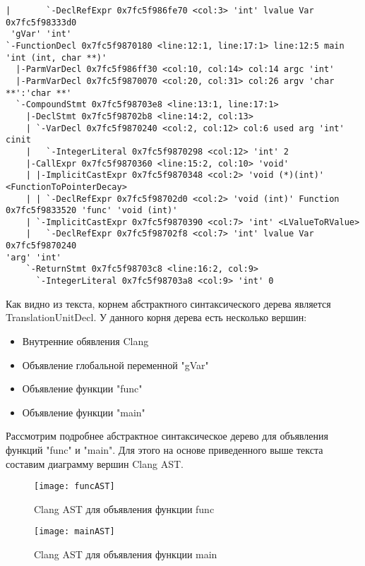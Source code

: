 \begin{lstlisting}[basicstyle=\tiny]
|       `-DeclRefExpr 0x7fc5f986fe70 <col:3> 'int' lvalue Var 0x7fc5f98333d0
 'gVar' 'int'
`-FunctionDecl 0x7fc5f9870180 <line:12:1, line:17:1> line:12:5 main 
'int (int, char **)'
  |-ParmVarDecl 0x7fc5f986ff30 <col:10, col:14> col:14 argc 'int'
  |-ParmVarDecl 0x7fc5f9870070 <col:20, col:31> col:26 argv 'char **':'char **'
  `-CompoundStmt 0x7fc5f98703e8 <line:13:1, line:17:1>
    |-DeclStmt 0x7fc5f98702b8 <line:14:2, col:13>
    | `-VarDecl 0x7fc5f9870240 <col:2, col:12> col:6 used arg 'int' cinit
    |   `-IntegerLiteral 0x7fc5f9870298 <col:12> 'int' 2
    |-CallExpr 0x7fc5f9870360 <line:15:2, col:10> 'void'
    | |-ImplicitCastExpr 0x7fc5f9870348 <col:2> 'void (*)(int)' 
<FunctionToPointerDecay>
    | | `-DeclRefExpr 0x7fc5f98702d0 <col:2> 'void (int)' Function 
0x7fc5f9833520 'func' 'void (int)'
    | `-ImplicitCastExpr 0x7fc5f9870390 <col:7> 'int' <LValueToRValue>
    |   `-DeclRefExpr 0x7fc5f98702f8 <col:7> 'int' lvalue Var 0x7fc5f9870240
'arg' 'int'
    `-ReturnStmt 0x7fc5f98703c8 <line:16:2, col:9>
      `-IntegerLiteral 0x7fc5f98703a8 <col:9> 'int' 0
\end{lstlisting}

Как видно из текста, корнем абстрактного синтаксического дерева является TranslationUnitDecl.
У данного корня дерева есть несколько вершин:
\begin{itemize}
 \item Внутренние обявления Clang
 \item Объявление глобальной переменной "gVar"
 \item Объявление функции "func"
 \item Объявление функции "main"
\end{itemize}

Рассмотрим подробнее абстрактное синтаксическое дерево для объявления функций "func" и "main". Для этого
на основе приведенного выше текста составим диаграмму вершин Clang AST.
\begin{figure}[H]
\centering
\texttt{[image: funcAST]}
\caption{Clang AST для объявления функции func}%
\label{fig:funcAST}
\end{figure}
\begin{figure}[H]
\centering
\texttt{[image: mainAST]}
\caption{Clang AST для объявления функции main}%
\label{fig:mainAST}
\end{figure}

